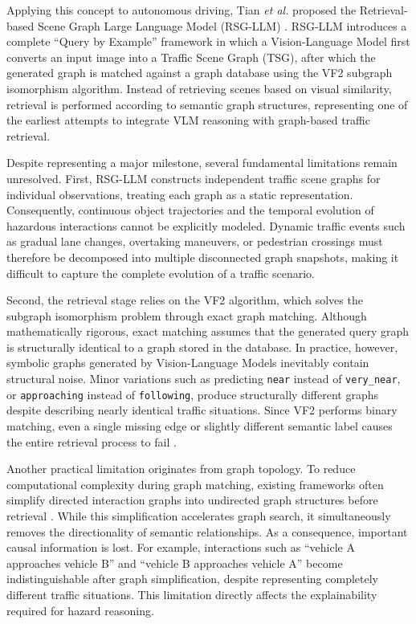 \documentclass[a4paper, 11pt]{article} %
\begin{document}
Applying this concept to autonomous driving, Tian \textit{et al.} proposed the Retrieval-based Scene Graph Large Language Model (RSG-LLM) \cite{tian2025query}. RSG-LLM introduces a complete ``Query by Example'' framework in which a Vision-Language Model first converts an input image into a Traffic Scene Graph (TSG), after which the generated graph is matched against a graph database using the VF2 subgraph isomorphism algorithm. Instead of retrieving scenes based on visual similarity, retrieval is performed according to semantic graph structures, representing one of the earliest attempts to integrate VLM reasoning with graph-based traffic retrieval.

Despite representing a major milestone, several fundamental limitations remain unresolved. First, RSG-LLM constructs independent traffic scene graphs for individual observations, treating each graph as a static representation. Consequently, continuous object trajectories and the temporal evolution of hazardous interactions cannot be explicitly modeled. Dynamic traffic events such as gradual lane changes, overtaking maneuvers, or pedestrian crossings must therefore be decomposed into multiple disconnected graph snapshots, making it difficult to capture the complete evolution of a traffic scenario.

Second, the retrieval stage relies on the VF2 algorithm, which solves the subgraph isomorphism problem through exact graph matching. Although mathematically rigorous, exact matching assumes that the generated query graph is structurally identical to a graph stored in the database. In practice, however, symbolic graphs generated by Vision-Language Models inevitably contain structural noise. Minor variations such as predicting \texttt{near} instead of \texttt{very\_near}, or \texttt{approaching} instead of \texttt{following}, produce structurally different graphs despite describing nearly identical traffic situations. Since VF2 performs binary matching, even a single missing edge or slightly different semantic label causes the entire retrieval process to fail \cite{cordella2004sub,tian2025query}.

Another practical limitation originates from graph topology. To reduce computational complexity during graph matching, existing frameworks often simplify directed interaction graphs into undirected graph structures before retrieval \cite{tian2025query}. While this simplification accelerates graph search, it simultaneously removes the directionality of semantic relationships. As a consequence, important causal information is lost. For example, interactions such as ``vehicle A approaches vehicle B'' and ``vehicle B approaches vehicle A'' become indistinguishable after graph simplification, despite representing completely different traffic situations. This limitation directly affects the explainability required for hazard reasoning.
\end{document}
